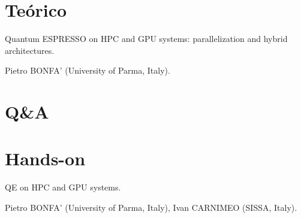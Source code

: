 \section{Teórico}

   Quantum ESPRESSO on HPC and GPU systems: parallelization and hybrid architectures.

   Pietro BONFA' (University of Parma, Italy).

\section{Q\&A}

\section{Hands-on}

   QE on HPC and GPU systems.

   Pietro BONFA' (University of Parma, Italy), Ivan CARNIMEO (SISSA, Italy).

